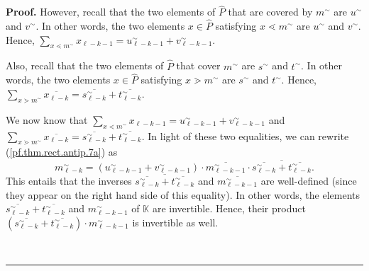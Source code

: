 \documentclass[numbers=enddot,12pt,final,onecolumn,notitlepage]{scrartcl}%
\theoremstyle{definition}
\newenvironment{verlong}{}{}
\newenvironment{proof}[1][Proof]{\noindent\textbf{#1.} }{\ \rule{0.5em}{0.5em}}
\let\sumnonlimits\sum
\renewcommand{\sum}{\sumnonlimits\limits}
\begin{document}
\begin{verlong}
\begin{proof}
However, recall that the two elements of $\widehat{P}$ that are covered by
$m^{\sim}$ are $u^{\sim}$ and $v^{\sim}$. In other words, the two elements
$x\in\widehat{P}$ satisfying $x\lessdot m^{\sim}$ are $u^{\sim}$ and $v^{\sim
}$. Hence, $\sum_{x\lessdot m^{\sim}}x_{\ell-k-1}=u_{\ell-k-1}^{\sim}%
+v_{\ell-k-1}^{\sim}$.

Also, recall that the two elements of $\widehat{P}$ that cover $m^{\sim}$ are
$s^{\sim}$ and $t^{\sim}$. In other words, the two elements $x\in\widehat{P}$
satisfying $x\gtrdot m^{\sim}$ are $s^{\sim}$ and $t^{\sim}$. Hence,
$\sum_{x\gtrdot m^{\sim}}\overline{x_{\ell-k}}=\overline{s_{\ell-k}^{\sim}%
}+\overline{t_{\ell-k}^{\sim}}$.

We now know that $\sum_{x\lessdot m^{\sim}}x_{\ell-k-1}=u_{\ell-k-1}^{\sim
}+v_{\ell-k-1}^{\sim}$ and $\sum_{x\gtrdot m^{\sim}}\overline{x_{\ell-k}%
}=\overline{s_{\ell-k}^{\sim}}+\overline{t_{\ell-k}^{\sim}}$. In light of
these two equalities, we can rewrite (\ref{pf.thm.rect.antip.7a}) as%
\begin{equation}
m_{\ell-k}^{\sim}=\left(  u_{\ell-k-1}^{\sim}+v_{\ell-k-1}^{\sim}\right)
\cdot\overline{m_{\ell-k-1}^{\sim}}\cdot\overline{\overline{s_{\ell-k}^{\sim}%
}+\overline{t_{\ell-k}^{\sim}}}. \label{pf.thm.rect.antip.7}%
\end{equation}
This entails that the inverses $\overline{\overline{s_{\ell-k}^{\sim}%
}+\overline{t_{\ell-k}^{\sim}}}$ and $\overline{m_{\ell-k-1}^{\sim}}$ are
well-defined (since they appear on the right hand side of this equality). In
other words, the elements $\overline{s_{\ell-k}^{\sim}}+\overline{t_{\ell
-k}^{\sim}}$ and $m_{\ell-k-1}^{\sim}$ of $\mathbb{K}$ are invertible. Hence,
their product $\left(  \overline{s_{\ell-k}^{\sim}}+\overline{t_{\ell-k}%
^{\sim}}\right)  \cdot m_{\ell-k-1}^{\sim}$ is invertible as well.


\end{proof}
\end{verlong}
\end{document}
